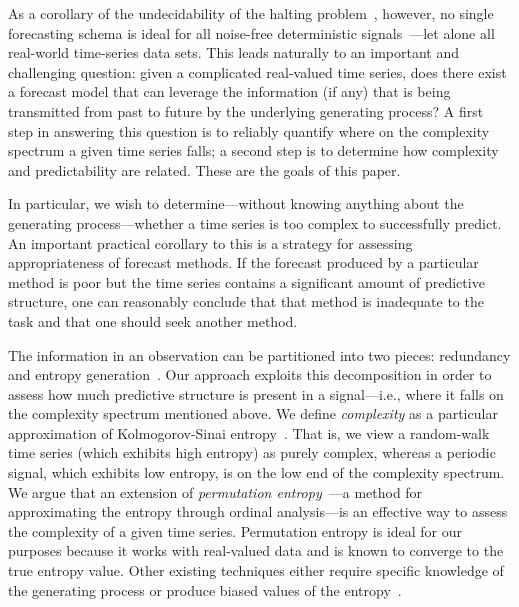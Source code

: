 As a corollary of the undecidability of the halting
problem~\cite{halting-problem}, however, no single forecasting schema
is ideal for all noise-free deterministic
signals~\cite{weigend-book}---let alone all real-world time-series
data sets.  This leads naturally to an important and challenging
question: given a complicated real-valued time series, does there
exist a forecast model that can leverage the information (if any) that
is being transmitted from past to future by the underlying generating
process?  A first step in answering this question is to reliably
quantify where on the complexity spectrum a given time series falls; a
second step is to determine how complexity and predictability are
related.  These are the goals of this paper.

In particular, we wish to determine---without knowing anything about
the generating process---whether a time series is too complex to successfully
predict.  An important practical corollary to this is a strategy for
assessing appropriateness of forecast methods.  If the forecast
produced by a particular method is poor but the time series contains a
significant amount of predictive structure, one can reasonably conclude that that method is inadequate
to the task and that one should seek another method.    

The information in an observation can be partitioned into two pieces:
redundancy and entropy generation~\cite{crutchfield2003}.  
\label{page:redundancy}
Our approach exploits this decomposition in order to assess how much
predictive structure is present in a signal---i.e., where it falls on
the complexity spectrum mentioned above.  We define \emph{complexity}
as a particular approximation of Kolmogorov-Sinai
entropy~\cite{lind95}.  That is, we view a random-walk time series
(which exhibits high entropy) as purely complex, whereas a periodic
signal, which exhibits low entropy, is on the low end of the
complexity spectrum.  We argue that an extension of \emph{permutation
  entropy}~\cite{bandt2002per}---a method for approximating the
entropy through ordinal analysis---is an effective way to assess the
complexity of a given time series.  Permutation entropy is ideal for
our purposes because it works with real-valued data and is known to
converge to the true entropy value. Other existing techniques either
require specific knowledge of the generating process or produce biased
values of the entropy~\cite{bollt2001}.

